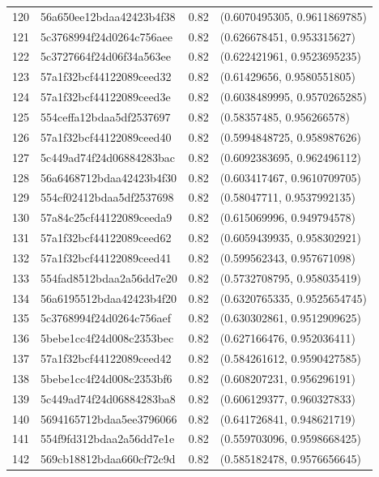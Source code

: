 \begin{table}[ht]
\begin{tabular}{rlrl}
  120 & 56a650ee12bdaa42423b4f38 & 0.82 & (0.6070495305, 0.9611869785) \\ 
  121 & 5c3768994f24d0264c756aee & 0.82 & (0.626678451, 0.953315627) \\ 
  122 & 5c3727664f24d06f34a563ee & 0.82 & (0.622421961, 0.9523695235) \\ 
  123 & 57a1f32bcf44122089ceed32 & 0.82 & (0.61429656, 0.9580551805) \\ 
  124 & 57a1f32bcf44122089ceed3e & 0.82 & (0.6038489995, 0.9570265285) \\ 
  125 & 554ceffa12bdaa5df2537697 & 0.82 & (0.58357485, 0.956266578) \\ 
  126 & 57a1f32bcf44122089ceed40 & 0.82 & (0.5994848725, 0.958987626) \\ 
  127 & 5c449ad74f24d06884283bac & 0.82 & (0.6092383695, 0.962496112) \\ 
  128 & 56a6468712bdaa42423b4f30 & 0.82 & (0.603417467, 0.9610709705) \\ 
  129 & 554cf02412bdaa5df2537698 & 0.82 & (0.58047711, 0.9537992135) \\ 
  130 & 57a84c25cf44122089ceeda9 & 0.82 & (0.615069996, 0.949794578) \\ 
  131 & 57a1f32bcf44122089ceed62 & 0.82 & (0.6059439935, 0.958302921) \\ 
  132 & 57a1f32bcf44122089ceed41 & 0.82 & (0.599562343, 0.957671098) \\ 
  133 & 554fad8512bdaa2a56dd7e20 & 0.82 & (0.5732708795, 0.958035419) \\ 
  134 & 56a6195512bdaa42423b4f20 & 0.82 & (0.6320765335, 0.9525654745) \\ 
  135 & 5c3768994f24d0264c756aef & 0.82 & (0.630302861, 0.9512909625) \\ 
  136 & 5bebe1cc4f24d008c2353bec & 0.82 & (0.627166476, 0.952036411) \\ 
  137 & 57a1f32bcf44122089ceed42 & 0.82 & (0.584261612, 0.9590427585) \\ 
  138 & 5bebe1cc4f24d008c2353bf6 & 0.82 & (0.608207231, 0.956296191) \\ 
  139 & 5c449ad74f24d06884283ba8 & 0.82 & (0.606129377, 0.960327833) \\ 
  140 & 5694165712bdaa5ee3796066 & 0.82 & (0.641726841, 0.948621719) \\ 
  141 & 554f9fd312bdaa2a56dd7e1e & 0.82 & (0.559703096, 0.9598668425) \\ 
  142 & 569cb18812bdaa660cf72c9d & 0.82 & (0.585182478, 0.9576656645) \\ 

\end{tabular}
\end{table}
